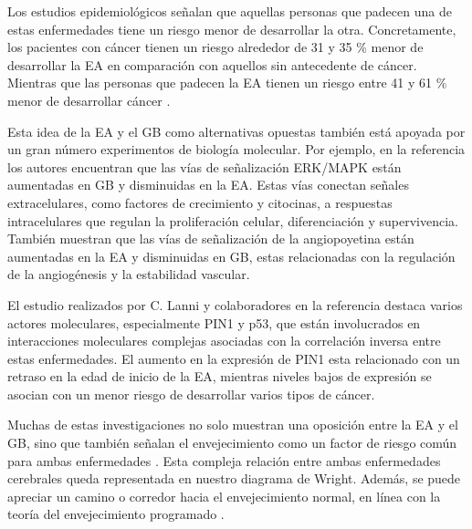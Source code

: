 Los estudios epidemiológicos señalan que aquellas personas que padecen una de estas enfermedades tiene un riesgo menor de desarrollar la otra. Concretamente, los pacientes con cáncer tienen un riesgo alrededor de 31 y 35 \% menor de desarrollar la EA en comparación con aquellos sin antecedente de cáncer. Mientras que las personas que padecen la EA tienen un riesgo entre 41 y 61 \% menor de desarrollar cáncer \cite{Roe_2010, Driver_2012, Musicco_2013}.

Esta idea de la EA y el GB como alternativas opuestas también está apoyada por un gran número experimentos de biología molecular. Por ejemplo, en la referencia \cite{Liu_2013} los autores encuentran que las vías de señalización ERK/MAPK están aumentadas en GB y disminuidas en la EA. Estas vías conectan señales extracelulares, como factores de crecimiento y citocinas, a respuestas intracelulares que regulan la proliferación celular, diferenciación y supervivencia. También muestran que las vías de señalización de la angiopoyetina están aumentadas en la EA y disminuidas en GB, estas relacionadas con la regulación de la angiogénesis y la estabilidad vascular.

El estudio realizados por C. Lanni y colaboradores en la referencia \cite{Lanni_2020} destaca varios actores moleculares, especialmente PIN1 y p53, que están involucrados en interacciones moleculares complejas asociadas con la correlación inversa entre estas enfermedades. El aumento en la expresión de PIN1 esta relacionado con un retraso en la edad de inicio de la EA, mientras niveles bajos de expresión se asocian con un menor riesgo de desarrollar varios tipos de cáncer.

Muchas de estas investigaciones no solo muestran una oposición entre la EA y el GB, sino que también señalan el envejecimiento como un factor de riesgo común para ambas enfermedades \cite{Driver_2012, Musicco_2013 , Liu_2013, Lanni_2020, A_Driver_2010}. Esta compleja relación entre ambas enfermedades cerebrales queda representada en nuestro diagrama de Wright. Además, se puede apreciar un camino o corredor hacia el envejecimiento normal, en línea con la teoría del envejecimiento programado \cite{Magalh_es_2012, 	Gems_2022}.

